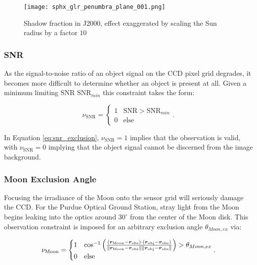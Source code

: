 \graphicspath{{/Users/liamrobinson/Documents/PyLightCurves/docs/build/html/_images}}
\begin{figure}[!htb]
  \centering
  \texttt{[image: sphx\_glr\_penumbra\_plane\_001.png]}
  \caption{Shadow fraction in J2000, effect exaggerated by scaling the Sun radius by a factor $10$}
  \label{fig:penumbra}
\end{figure}
\graphicspath{{/Users/liamrobinson/Documents/msthesis/static_images/aas_2022_figs}}

\subsubsection{SNR}

As the signal-to-noise ratio of an object signal on the CCD pixel grid degrades, it becomes more difficult to determine whether an object is present at all. Given a minimum limiting SNR $\mathrm{SNR}_{min}$ this constraint takes the form:

\begin{equation} \label{eq:snr_exclusion}
  \nu_{\mathrm{SNR}} = \begin{cases}
    1 & \mathrm{SNR} > \mathrm{SNR}_{min}\\
    0 & \mathrm{else}
  \end{cases}.
\end{equation}

In Equation \ref{eq:snr_exclusion}, $\nu_{\mathrm{SNR}} = 1$ implies that the observation is valid, with $\nu_{\mathrm{SNR}} = 0$ implying that the object signal cannot be discerned from the image background.

\subsubsection{Moon Exclusion Angle}

Focusing the irradiance of the Moon onto the sensor grid will seriously damage the CCD. For the Purdue Optical Ground Station, stray light from the Moon begins leaking into the optics around $30^\circ$ from the center of the Moon disk. This observation constraint is imposed for an arbitrary exclusion angle $\theta_{Moon,ex}$ via:

\begin{equation} \label{eq:moon_exclusion}
  \nu_\mathrm{Moon} = \begin{cases}
    1 & \cos^{-1}\left( \frac{\left( \bm{r}_\mathrm{Moon} - \bm{r}_\mathrm{obs} \right) \cdot \left( \bm{r}_\mathrm{obj} - \bm{r}_\mathrm{obs} \right)}{\| \bm{r}_\mathrm{Moon} - \bm{r}_\mathrm{obs} \| \| \bm{r}_\mathrm{obj} - \bm{r}_\mathrm{obs} \|} \right) > \theta_{Moon,ex}\\
    0 & \mathrm{else}
  \end{cases}.
\end{equation}

